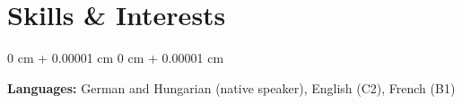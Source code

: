 \documentclass[10pt, letterpaper]{article}
\newenvironment{highlights}{
    \begin{itemize}[
        topsep=0.10 cm,
        parsep=0.10 cm,
        partopsep=0pt,
        itemsep=0pt,
        leftmargin=0 cm + 10pt
    ]
}{
    \end{itemize}
} %
\newenvironment{onecolentry}{
    \begin{adjustwidth}{
        0 cm + 0.00001 cm
    }{
        0 cm + 0.00001 cm
    }
}{
    \end{adjustwidth}
} %
\newenvironment{twocolentry}[2][]{
    \onecolentry
    \def\secondColumn{#2}
    \setcolumnwidth{\fill, 4.5 cm}
    \begin{paracol}{2}
}{
    \switchcolumn \raggedleft \secondColumn
    \end{paracol}
    \endonecolentry
} %
\begin{document}
  







        


    \section{Skills \& Interests}

        \begin{onecolentry}
            \textbf{Languages:} German and Hungarian (native speaker), English (C2), French (B1)
        \end{onecolentry}
\end{document}
